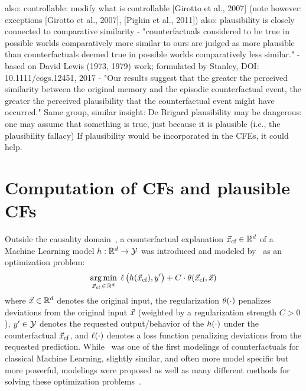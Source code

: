 {also: controllable: modify what is controllable [Girotto et al., 2007] (note however: exceptions [Girotto et al., 2007], [Pighin et al., 2011])
}\textcolor{ACMDarkBlue}{
also: 
plausibility is closely connected to comparative similarity - "counterfactuals considered to be true in possible worlds comparatively more similar to ours are judged as more plausible than counterfactuals deemed true in possible worlds comparatively less similar." - based on David Lewis (1973, 1979) work; formulated by Stanley, DOI: 10.1111/cogs.12451, 2017 - "Our results suggest that the greater the perceived similarity between the original memory and the episodic counterfactual event, the greater the perceived plausibility that the counterfactual event might have occurred."
Same group, similar insight: De Brigard
}\textcolor{ACMDarkBlue}{
% 
plausibility may be dangerous: one may assume that something is true, just because it is plausible (i.e., the plausibility fallacy)
}\textcolor{ACMDarkBlue}{
If plausibility would be incorporated in the CFEs, it could help.
}

\section{Computation of CFs and plausible CFs}\label{sec:EffCompCFs}
Outside the causality domain~\citep{halpern_causality_2020,karimi_counterfactuals_survey_2020}, a counterfactual explanation ${\vec{x}_{\text{cf}}}\in\mathbb{R}^d$ of a Machine Learning model $h:\mathbb{R}^d\to\mathcal{Y}$ was introduced and modeled by~\citep{wachter_counterfactual_2017} as an optimization problem:
\begin{equation}\label{eq:counterfactual_opt_original}
\underset{{\vec{x}_{\text{cf}}} \,\in\, \mathbb{R}^d}{\arg\min}\; \operatorname*{{\ell}}\big(h({\vec{x}_{\text{cf}}}), y'\big) + C \cdot \operatorname*{{\theta}}({\vec{x}_{\text{cf}}}, \vec{x})
\end{equation}
where $\vec{x}\in\mathbb{R}^d$ denotes the original input, the regularization $\operatorname*{{\theta}}(\cdot)$ penalizes deviations from the original input $\vec{x}$ (weighted by a regularization strength $C>0$), $y'\in\mathcal{Y}$ denotes the requested output/behavior of the $h(\cdot)$ under the counterfactual ${\vec{x}_{\text{cf}}}$, and $\operatorname*{{\ell}}(\cdot)$ denotes a loss function penalizing deviations from the requested prediction.
While~ was one of the first modelings of counterfactuals for classical Machine Learning, slightly similar, and often more model specific but more powerful, modelings were proposed as well as many different methods for solving these optimization problems~\citep{verma_counterfactual_2020,artelt_counterfactuals_survey_2019,karimi_counterfactuals_survey_2020}.

